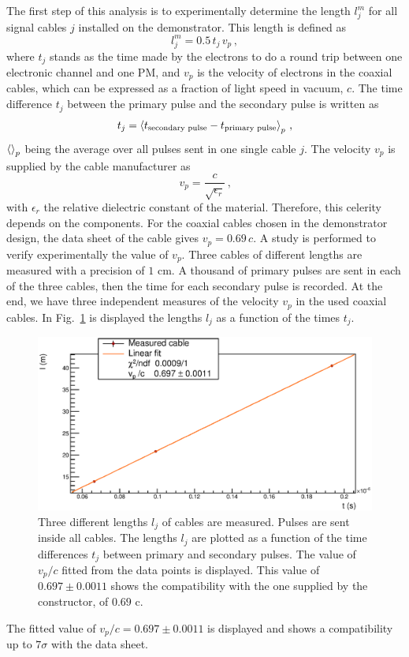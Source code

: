 The first step of this analysis is to experimentally determine the length $l_{j}^{m}$ for all signal cables $j$ installed on the demonstrator.
This length is defined as
\begin{equation}
  l_{j}^{m}= 0.5\,t_{j}\,v_{p}\, ,
\end{equation}
where $t_{j}$ stands as the time made by the electrons to do a round trip between one electronic channel and one PM, and $v_{p}$ is the velocity of electrons in the coaxial cables, which can be expressed as a fraction of light speed in vacuum, $c$.
The time difference $t_{j}$ between the primary pulse and the secondary pulse is written as
\begin{equation}
  t_{j} = \braket{t_{\text{secondary pulse}}-t_{\text{primary pulse}}}_{p} \, \text{,}
\end{equation}
$\braket{}_{p}$ being the average over all pulses sent in one single cable $j$.
The velocity $v_{p}$ is supplied by the cable manufacturer as
\begin{equation*}
  v_{p}=\frac{c}{\sqrt{\epsilon_{r}}}\,\text{,}
\end{equation*}
with $\epsilon_{r}$ the relative dielectric constant of the material.
Therefore, this celerity depends on the components.
For the coaxial cables chosen in the demonstrator design, the data sheet of the cable gives ${v_{p}=0.69\,c}$.
A study is performed to verify experimentally the value of $v_{p}$.
Three cables of different lengths are measured with a precision of $1$ cm.
A thousand of primary pulses are sent in each of the three cables, then the time for each secondary pulse is recorded.
At the end, we have three independent measures of the velocity $v_{p}$ in the used coaxial cables.
In Fig.~\ref{fig:celerity} is displayed the lengths $l_{j}$ as a function of the times $t_{j}$.
\begin{figure}[h!]
  \centering
  \includegraphics[width=15cm]{commissioning/fig_commissioning/celerity.eps}
  \caption{Three different lengths $l_{j}$ of cables are measured.
    Pulses are sent inside all cables.
    The lengths $l_{j}$ are plotted as a function of the time differences $t_{j}$ between primary and secondary pulses.
    The value of $v_{p}/c$ fitted from the data points is displayed.
    This value of $0.697\pm 0.0011$ shows the compatibility with the one supplied by the constructor, of $0.69$ c.
    \label{fig:celerity}}
\end{figure}
The fitted value of $v_{p}/c = 0.697\pm 0.0011$ is displayed and shows a compatibility up to $7\sigma$ with the data sheet.

